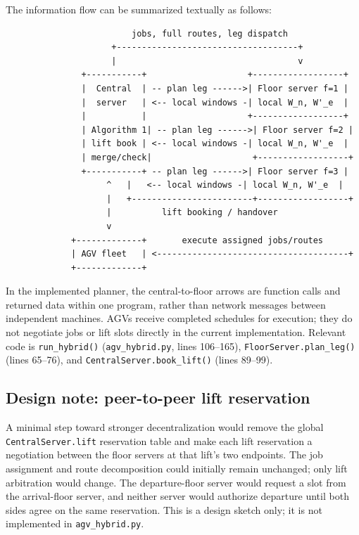 \documentclass[11pt]{article}
\begin{document}
The information flow can be summarized textually as follows:
\begin{verbatim}
                         jobs, full routes, leg dispatch
                     +------------------------------------+
                     |                                    v
               +-----------+                    +------------------+
               |  Central  | -- plan leg ------>| Floor server f=1 |
               |  server   | <-- local windows -| local W_n, W'_e  |
               |           |                    +------------------+
               | Algorithm 1| -- plan leg ------>| Floor server f=2 |
               | lift book | <-- local windows -| local W_n, W'_e  |
               | merge/check|                    +------------------+
               +-----------+ -- plan leg ------>| Floor server f=3 |
                    ^   |   <-- local windows -| local W_n, W'_e  |
                    |   +------------------------+------------------+
                    |          lift booking / handover
                    v
             +-------------+       execute assigned jobs/routes
             | AGV fleet   | <--------------------------------------+
             +-------------+
\end{verbatim}
In the implemented planner, the central-to-floor arrows are function calls
and returned data within one program, rather than network messages between
independent machines. AGVs receive completed schedules for execution; they
do not negotiate jobs or lift slots directly in the current implementation.
Relevant code is \texttt{run\_hybrid()} (\texttt{agv\_hybrid.py}, lines
106--165), \texttt{FloorServer.plan\_leg()} (lines 65--76), and
\texttt{CentralServer.book\_lift()} (lines 89--99).

\subsection{Design note: peer-to-peer lift reservation}

A minimal step toward stronger decentralization would remove the global
\texttt{CentralServer.lift} reservation table and make each lift reservation
a negotiation between the floor servers at that lift's two endpoints. The
job assignment and route decomposition could initially remain unchanged;
only lift arbitration would change. The departure-floor server would request
a slot from the arrival-floor server, and neither server would authorize
departure until both sides agree on the same reservation. This is a
design sketch only; it is not implemented in \texttt{agv\_hybrid.py}.
\end{document}

